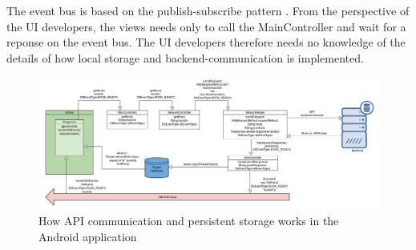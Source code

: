 The event bus is based on the publish-subscribe pattern \cite[p. 226-229]{progark}. From the perspective of the UI developers, the views needs only to call the MainController and wait for a reponse on the event bus. The UI developers therefore needs no knowledge of the details of how local storage and backend-communication is implemented. 

\begin{figure}
    \centering
    \includegraphics[width=\paperwidth,height=\paperheight,keepaspectratio,angle=90,origin=c]{figs/arch_diagv2.png}
    \caption{How \gls{API} communication and persistent storage works in the Android application}
    \label{fig:Android-api-communication}
\end{figure}

